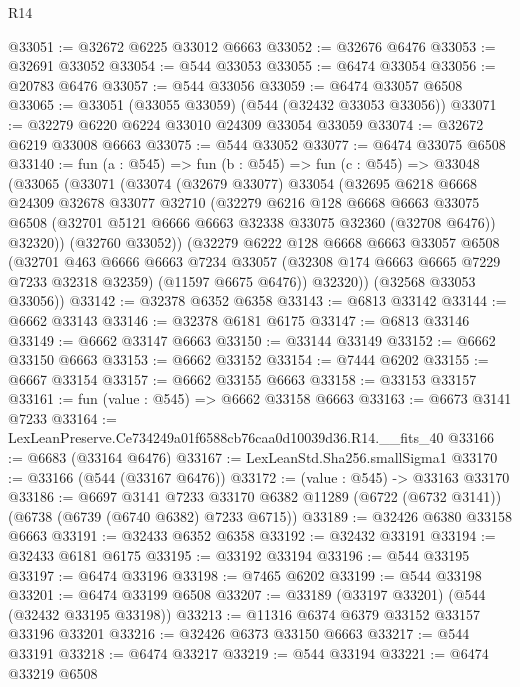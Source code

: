 \begin{lexlean}{R14}
\begin{coremodule}
@33051 := @32672 @6225 @33012 @6663
@33052 := @32676 @6476
@33053 := @32691 @33052
@33054 := @544 @33053
@33055 := @6474 @33054
@33056 := @20783 @6476
@33057 := @544 @33056
@33059 := @6474 @33057 @6508
@33065 := @33051 (@33055 @33059) (@544 (@32432 @33053 @33056))
@33071 := @32279 @6220 @6224 @33010 @24309 @33054 @33059
@33074 := @32672 @6219 @33008 @6663
@33075 := @544 @33052
@33077 := @6474 @33075 @6508
@33140 := fun (a : @545) =>
  fun (b : @545) =>
  fun (c : @545) =>
  @33048
    (@33065
      (@33071
        (@33074
          (@32679 @33077)
          @33054
          (@32695
            @6218
            @6668
            @24309
            @32678
            @33077
            @32710
            (@32279
              @6216
              @128
              @6668
              @6663
              @33075
              @6508
              (@32701 @5121 @6666 @6663 @32338 @33075 @32360 (@32708 @6476))
              @32320))
          (@32760 @33052))
        (@32279
          @6222
          @128
          @6668
          @6663
          @33057
          @6508
          (@32701
            @463
            @6666
            @6663
            @7234
            @33057
            (@32308 @174 @6663 @6665 @7229 @7233 @32318 @32359)
            (@11597 @6675 @6476))
          @32320))
      (@32568 @33053 @33056))
@33142 := @32378 @6352 @6358
@33143 := @6813 @33142
@33144 := @6662 @33143
@33146 := @32378 @6181 @6175
@33147 := @6813 @33146
@33149 := @6662 @33147 @6663
@33150 := @33144 @33149
@33152 := @6662 @33150 @6663
@33153 := @6662 @33152
@33154 := @7444 @6202
@33155 := @6667 @33154
@33157 := @6662 @33155 @6663
@33158 := @33153 @33157
@33161 := fun (value : @545) => @6662 @33158 @6663
@33163 := @6673 @3141 @7233
@33164 := LexLeanPreserve.Ce734249a01f6588cb76caa0d10039d36.R14.__fits_40
@33166 := @6683 (@33164 @6476)
@33167 := LexLeanStd.Sha256.smallSigma1
@33170 := @33166 (@544 (@33167 @6476))
@33172 := (value : @545) -> @33163 @33170
@33186 := @6697
    @3141
    @7233
    @33170
    @6382
    @11289
    (@6722 (@6732 @3141))
    (@6738 (@6739 (@6740 @6382) @7233 @6715))
@33189 := @32426 @6380 @33158 @6663
@33191 := @32433 @6352 @6358
@33192 := @32432 @33191
@33194 := @32433 @6181 @6175
@33195 := @33192 @33194
@33196 := @544 @33195
@33197 := @6474 @33196
@33198 := @7465 @6202
@33199 := @544 @33198
@33201 := @6474 @33199 @6508
@33207 := @33189 (@33197 @33201) (@544 (@32432 @33195 @33198))
@33213 := @11316 @6374 @6379 @33152 @33157 @33196 @33201
@33216 := @32426 @6373 @33150 @6663
@33217 := @544 @33191
@33218 := @6474 @33217
@33219 := @544 @33194
@33221 := @6474 @33219 @6508

\end{coremodule}
\end{lexlean}
